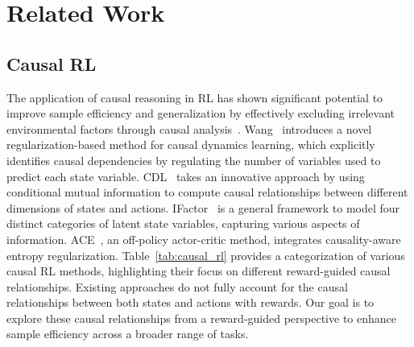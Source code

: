 \section{Related Work}
\vspace{-1mm}
\subsection{Causal RL} 
\vspace{-1mm}
The application of causal reasoning in RL has shown significant potential to improve sample efficiency and generalization by effectively excluding irrelevant environmental factors through causal analysis~\citep{huangadarl,feng2023learning,mutti2023provably, sun2024acamda, sun2022toward}. Wang~\citep{wang2021task} introduces a novel regularization-based method for causal dynamics learning, which explicitly identifies causal dependencies by regulating the number of variables used to predict each state variable. 
CDL~\citep{wang2022causal} takes an innovative approach by using conditional mutual information to compute causal relationships between different dimensions of states and actions. 
IFactor~\citep{liu2024learning} is a general framework to model four distinct categories of latent state variables, capturing various aspects of information. ACE~\citep{ji2024ace}, an off-policy actor-critic method, integrates causality-aware entropy regularization. Table~\ref{tab:causal_rl} provides a categorization of various causal RL methods, highlighting their focus on different reward-guided causal relationships. 
Existing approaches do not fully account for the causal relationships between both states and actions with rewards. Our goal is to explore these causal relationships from a reward-guided perspective to enhance sample efficiency across a broader range of tasks.
\vspace{-3mm}

